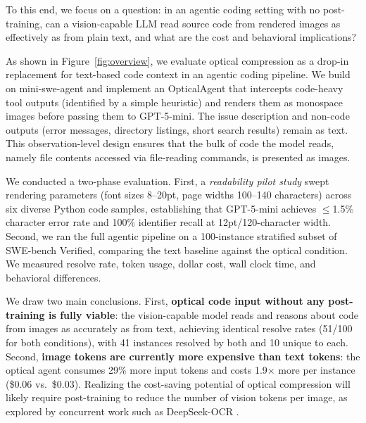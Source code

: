 To this end, we focus on a question: in an agentic coding setting with no post-training, can a vision-capable LLM read source code from rendered images as effectively as from plain text, and what are the cost and behavioral implications?



As shown in Figure~\ref{fig:overview}, we evaluate optical compression as a drop-in replacement for text-based code context in an agentic coding pipeline. We build on mini-swe-agent \cite{yang2024sweagent} and implement an OpticalAgent that intercepts code-heavy tool outputs (identified by a simple heuristic) and renders them as monospace images before passing them to GPT-5-mini. The issue description and non-code outputs (error messages, directory listings, short search results) remain as text. This observation-level design ensures that the bulk of code the model reads, namely file contents accessed via file-reading commands, is presented as images.

We conducted a two-phase evaluation. First, a \emph{readability pilot study} swept rendering parameters (font sizes 8--20pt, page widths 100--140 characters) across six diverse Python code samples, establishing that GPT-5-mini achieves $\le$1.5\% character error rate and 100\% identifier recall at 12pt/120-character width. Second, we ran the full agentic pipeline on a 100-instance stratified subset of SWE-bench Verified, comparing the text baseline against the optical condition. We measured resolve rate, token usage, dollar cost, wall clock time, and behavioral differences.

We draw two main conclusions. First, \textbf{optical code input without any post-training is fully viable}: the vision-capable model reads and reasons about code from images as accurately as from text, achieving identical resolve rates (51/100 for both conditions), with 41 instances resolved by both and 10 unique to each. Second, \textbf{image tokens are currently more expensive than text tokens}: the optical agent consumes 29\% more input tokens and costs 1.9$\times$ more per instance (\$0.06 vs.\ \$0.03). Realizing the cost-saving potential of optical compression will likely require post-training to reduce the number of vision tokens per image, as explored by concurrent work such as DeepSeek-OCR \cite{wei2025deepseekocr}.

